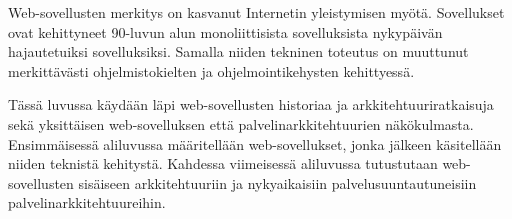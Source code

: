 Web-sovellusten merkitys on kasvanut Internetin yleistymisen myötä. Sovellukset ovat kehittyneet 90-luvun alun monoliittisista sovelluksista nykypäivän hajautetuiksi sovelluksiksi. Samalla niiden tekninen toteutus on muuttunut merkittävästi ohjelmistokielten ja ohjelmointikehysten kehittyessä.

Tässä luvussa käydään läpi web-sovellusten historiaa ja arkkitehtuuriratkaisuja sekä yksittäisen web-sovelluksen että palvelinarkkitehtuurien näkökulmasta. Ensimmäisessä aliluvussa määritellään web-sovellukset, jonka jälkeen käsitellään niiden teknistä kehitystä. Kahdessa viimeisessä aliluvussa tutustutaan web-sovellusten sisäiseen arkkitehtuuriin ja nykyaikaisiin palvelusuuntautuneisiin palvelinarkkitehtuureihin.